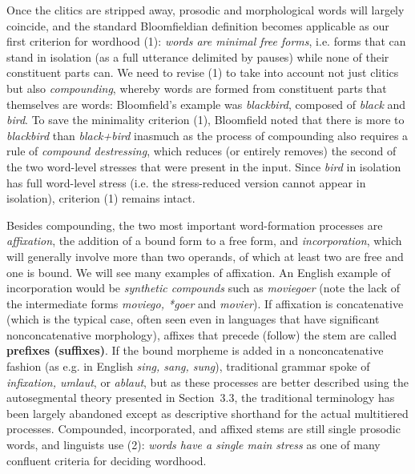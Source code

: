 Once the clitics are stripped away, prosodic and morphological words will
largely coincide, and the standard Bloomfieldian definition becomes applicable
as our first criterion for wordhood (1): {\it words are minimal free forms},
i.e.  forms that can stand in isolation (as a full utterance delimited by
pauses) while none of their constituent parts can.  We need
to revise (1) to take into account not just clitics but also {\it
compounding}, whereby words are formed from constituent
parts that themselves are words: Bloomfield's example was {\it blackbird},
composed of {\it black} and {\it bird}. To save the minimality criterion (1),
Bloomfield noted that there is more to {\it blackbird} than {\it black+bird}
inasmuch as the process of compounding also requires a rule of {\it compound
destressing}, which reduces (or entirely removes) the second of the two
word-level stresses that were present in the input. Since {\it bird} in
isolation has full word-level stress (i.e.  the stress-reduced version cannot
appear in isolation), criterion (1) remains intact. 

Besides compounding, the two most important word-formation processes are {\it
  affixation}, the addition of a bound form to a free form, and {\it
  incorporation}, which will generally involve more than two operands, of
which at least two are free and one is bound. We will see many examples of
affixation. An English example of incorporation would be {\it synthetic
  compounds} such as {\it moviegoer} (note the lack of the intermediate forms
{\it *moviego, *goer} and {\it *movier}).
If affixation is concatenative (which is the typical case,
often seen even in languages that have significant nonconcatenative
morphology), affixes that precede (follow) the stem are called {\bf prefixes
  (suffixes)}. If the bound morpheme is added in a nonconcatenative
fashion (as e.g. in English {\it sing, sang, sung}), traditional grammar spoke
of {\it infixation, umlaut}, or {\it ablaut}, but as these processes are
better described using the autosegmental theory presented in Section~3.3, the
traditional terminology has been largely abandoned except as descriptive
shorthand for the actual multitiered
processes.
Compounded, incorporated, and affixed stems are still single
prosodic words, and linguists use (2): {\it words have a single main stress}
as one of many confluent criteria for deciding wordhood.

